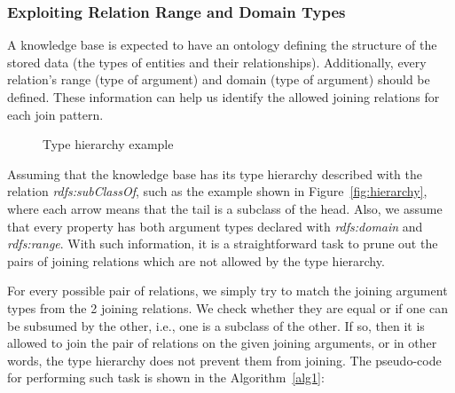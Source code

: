 \subsubsection{Exploiting Relation Range and Domain Types}

A knowledge base is expected to have an ontology defining the structure of the stored data (the types of entities and
their relationships). Additionally, every relation's range (type of  argument) and domain (type of 
argument) should be defined. These information can help us identify the allowed joining relations for each join
pattern.

\begin{figure}[h!]
  \label{fig:hierarchy}
  \caption{Type hierarchy example}
  \centering

\label{fig:typeHierarchy}
\end{figure}

Assuming that the knowledge base has its type hierarchy described with the relation \emph{rdfs:subClassOf}, such as
the
example shown in Figure~\ref{fig:hierarchy}, where each arrow means that the tail is a subclass of the head. Also,
we assume that every property has both argument types declared with \emph{rdfs:domain} and \emph{rdfs:range}. With
such information, it is a straightforward task to prune out the pairs of joining relations which are not allowed by
the type hierarchy.    

For every possible pair of relations, we simply try to match the joining argument types from the 2 joining relations.
We
check whether they are equal or if one can be subsumed by the other, i.e., one is a subclass of the other. If so, then
it is allowed to join the pair of relations on the given joining arguments, or in other words, the type hierarchy does
not prevent them from joining. The pseudo-code for performing such task is shown in the Algorithm~\ref{alg1}:

